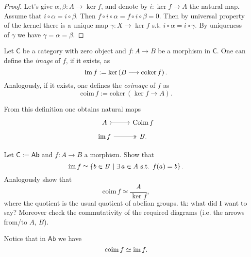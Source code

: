 \documentclass[../Main]{subfiles}
\begin{document}
\begin{proof}
	Let's give $\alpha,\beta \colon A \to \ker f$, and denote
	by $i\colon \ker f \to A$ the natural map.
	Assume that $i \circ \alpha = i \circ \beta$.
	Then $f \circ i \circ \alpha = f \circ i \circ \beta = 0$.
	Then by universal property of the kernel there is a unique map
	$\gamma\colon X \to \ker f$ s.t. $i \circ \alpha = i \circ \gamma$.
	By uniqueness of $\gamma$ we have $\gamma = \alpha = \beta$.
\end{proof}

\begin{defn}[(Co)image]
	Let $\mathsf{C}$ be a category with zero object and $f\colon A \to B$
	be a morphism in $\mathsf{C}$.
	One can define the {\em image} of $f$, if it exists, as
	\begin{equation}
		\operatorname{im} f := \ker \left( B \longrightarrow \mathrm{coker}\, f \right)
	.\end{equation} 
	Analogously, if it exists, one defines the {\em coimage} of $f$ as
	\begin{equation}
		\mathrm{coim}\, f := \mathrm{coker}\, \left( \ker f \longrightarrow A \right)
	.\end{equation} 
\end{defn}

\begin{rem}[]
	From this definition one obtains natural maps
	\begin{equation}
		\begin{tikzcd}[row sep=tiny]
			A \arrow[r, "", rightarrowtail] &
		\mathrm{Coim}\, f \\
			\ima f \arrow[r, "", twoheadrightarrow] & 
		B.
	\end{tikzcd}
	\end{equation} 
\end{rem}

\begin{exr}
	Let $\mathsf{C} := \mathsf{Ab}$ and $f\colon A \to B$ a morphism.
	Show that
	\begin{equation}
	\ima f \simeq \left\{ b \in B \ \middle|\ 
	\exists\, a \in A \text{ s.t. } f(a) = b \right\}
	.\end{equation} 
	Analogously show that
	\begin{equation}
	\mathrm{coim}\, f \simeq \frac{A}{\ker f}
	,\end{equation} 
	where the quotient is the usual quotient of abelian groups.
	tk: what did I want to say?
	Moreover check the commutativity of the required diagrams (i.e. the arrows from/to $A$, $B$).

	Notice that in $\mathsf{Ab}$ we have
	\begin{equation}
	\mathrm{coim}\, f \simeq \operatorname{im} f
	.\end{equation} 
\end{exr} 
\end{document}
